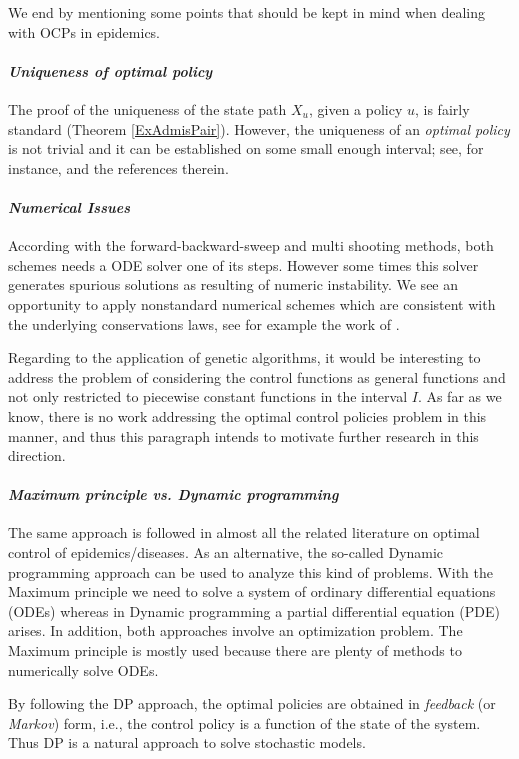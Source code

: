We end by mentioning some points that should be kept in mind when dealing with OCPs in epidemics.

\paragraph{\it Uniqueness of optimal policy}
The proof of the uniqueness of the state path $X_u$, given a policy $u$, is
fairly standard (Theorem \ref{ExAdmisPair}). However, the uniqueness of an 
{\it optimal policy} is not trivial and it can be established on some small 
enough interval; see, for instance, \cite{GaffSchaefer09} and the references 
therein.  
\medskip

\paragraph{\it Numerical Issues}
  According with the forward-backward-sweep and multi shooting methods, both 
schemes needs a ODE solver one of its steps. However some times this solver 
generates spurious solutions as resulting of numeric instability. We see an 
opportunity to  apply nonstandard numerical schemes which are consistent with 
the underlying conservations laws, see for example the work of 
\citet{Mickens2007a}.
  
  Regarding to the application of genetic algorithms, it would be interesting to address the problem of considering the control functions as general 
functions and not only restricted to piecewise constant functions in the 
interval $I$. As far as we know, there is no work addressing  the optimal 
control policies problem in this manner, and thus this paragraph intends to 
motivate further research in this direction.
\medskip

\paragraph{\it Maximum principle vs. Dynamic programming} 
  The same approach is followed in almost all the related literature on optimal
control of epidemics/diseases. As an alternative, the so-called Dynamic
programming approach can be used to analyze this kind of problems. With the
Maximum principle we need to solve a system of ordinary differential equations
(ODEs) whereas in Dynamic programming a partial differential equation (PDE)
arises. In addition, both approaches involve an optimization problem. The
Maximum principle is mostly used because there are plenty of methods to
numerically solve ODEs. 

By following the DP approach, the optimal policies are obtained in {\it feedback} (or {\it Markov}) form, i.e., the control policy is a function of the state of the system. Thus DP is a natural approach to solve stochastic models.

